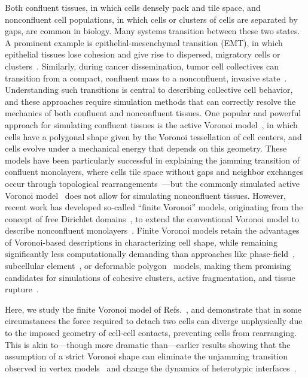 Both confluent tissues, in which cells densely pack and tile space, and nonconfluent cell populations, in which cells or clusters of cells are separated by gaps, are common in biology. Many systems transition between these two states.
A prominent example is epithelial-mesenchymal transition (EMT), in which epithelial tissues lose cohesion and give rise to dispersed, migratory cells or clusters~\cite{youssef2024epithelial, tripathi2020physics}.
Similarly, during cancer dissemination, tumor cell collectives can transition from a compact, confluent mass to a nonconfluent, invasive state~\cite{harper2016mechanism, cheung2016collective}.
Understanding such transitions is central to describing collective cell behavior, and these approaches require simulation methods that can correctly resolve the mechanics of both confluent and nonconfluent tissues. One popular and powerful approach for simulating confluent tissues is the active Voronoi model~\cite{bi2016motility}, in which cells have a polygonal shape given by the Voronoi tessellation of cell centers, and cells evolve under a mechanical energy that depends on this geometry. These models have been particularly successful in explaining the jamming transition of confluent monolayers, where cells tile space without gaps and neighbor exchanges occur through topological rearrangements~\cite{bi2015density, bi2016motility, chen2022activation}---but the commonly simulated active Voronoi model~\cite{bi2016motility} does not allow for simulating nonconfluent tissues. However, recent work has developed so-called ``finite Voronoi'' models, originating from the concept of free Dirichlet domains~\cite{graner1993can}, to extend the conventional Voronoi model to describe nonconfluent monolayers~\cite{bock2010generalized, schaller2005multicellular, teomy2018confluent, huang2023bridging}. Finite Voronoi models retain the advantages of Voronoi-based descriptions in characterizing cell shape, while remaining significantly less computationally demanding than approaches like phase-field~\cite{nonomura2012study, palmieri2015multiple, chiang2024multiphase, wang2025confinement}, subcellular element~\cite{sandersius2008modeling, sweet2011modelling, sandersius2011emergent}, or deformable polygon~\cite{boromand2018jamming, lv2024active, weng2022convergent} models, making them promising candidates for simulations of cohesive clusters, active fragmentation, and tissue rupture~\cite{huang2023bridging, teomy2018confluent}.

Here, we study the finite Voronoi model of Refs.~\cite{teomy2018confluent,huang2023bridging}, and demonstrate that in some circumstances the force required to detach two cells can diverge unphysically due to the imposed geometry of cell-cell contacts, preventing cells from rearranging. This is akin to---though more dramatic than---earlier results showing that the assumption of a strict Voronoi shape can eliminate the unjamming transition observed in vertex models~\cite{sussman2018no} and change the dynamics of heterotypic interfaces~\cite{lawson2024differences,yue2024scale}.

